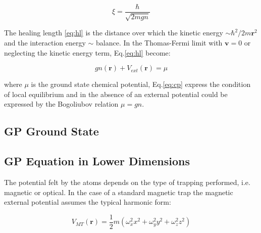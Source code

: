 \documentclass[../main.tex]{subfiles}
\begin{document}
\begin{equation}
\xi = \frac{\hbar}{\sqrt{2mgn}}
\label{eq:hl}
\end{equation}

The healing length \ref{eq:hl} is the distance over which the kinetic energy $\sim \hbar^2/2m\textbf{r}^2$ and the interaction energy $\sim $ balance. In the Thomas-Fermi limit with $\textbf{v} = 0$ or neglecting the kinetic energy term, Eq.\ref{eq:hl} become:

\begin{equation}
gn(\textbf{r}) + V_{ext}(\textbf{r}) = \mu
\label{eq:cp}
\end{equation}

where $\mu$ is the ground state chemical potential, Eq.\ref{eq:cp} express the condition of local equilibrium and in the absence of an external potential could be expressed by the Bogoliubov relation $\mu = gn$.

\subsection{GP Ground State}



\subsection{GP Equation in Lower Dimensions}

The potential felt by the atoms depends on the type of trapping performed, i.e. magnetic or optical. 
In the case of a standard magnetic trap the magnetic external potential assumes the typical harmonic form:

\begin{equation}
V_{MT}(\textbf{r}) = \frac{1}{2} m (\omega_x^2x^2 + \omega_y^2y^2 + \omega_z^2z^2)
\end{equation}
\end{document}

